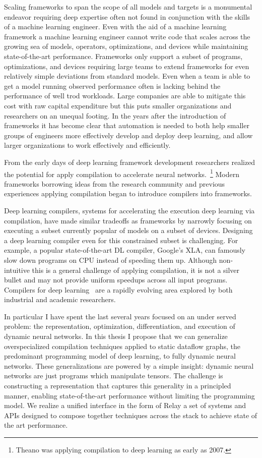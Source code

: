 Scaling frameworks to span the scope of all models and targets is a monumental endeavor
  requiring deep expertise often not found in conjunction with the skills of a
  machine learning engineer.
Even with the aid of a machine learning framework a machine learning engineer
  cannot write code that scales across the growing sea of
  models, operators, optimizations, and devices while maintaining state-of-the-art performance.
Frameworks only support a subset of programs, optimizations, and devices
  requiring large teams to extend frameworks for even relatively simple deviations
  from standard models.
Even when a team is able to get a model running observed performance often
  is lacking behind the performance of well trod workloads.
Large companies are able to mitigate this cost with raw capital expenditure
  but this puts smaller organizations and researchers on an unequal footing.
In the years after the introduction of frameworks it has become clear
  that automation is needed to both help smaller groups of engineers
  more effectively develop and deploy deep learning, and allow larger
  organizations to work effectively and efficiently.

From the early days of deep learning framework development researchers realized the
  potential for apply compilation to accelerate neural networks.~\footnote{Theano was applying
  compilation to deep learning as early as 2007.}
Modern frameworks borrowing ideas from the research community and previous
  experiences applying compilation began to introduce compilers into frameworks.

Deep learning compilers, systems for accelerating the execution deep learning via compilation,
 have made similar tradeoffs as frameworks by narrowly focusing on executing a subset
 currently popular of models on a subset of devices.
Designing a deep learning compiler even for this constrained subset is challenging.
For example,
  a popular state-of-the-art DL compiler,
  Google's XLA, can famously slow down programs on
  CPU instead of speeding them up.
Although non-intuitive this is a general challenge of applying compilation,
  it is not a silver bullet and may not provide uniform speedups across all input programs.
Compilers for deep learning~\citep{xla,jax,glow,tvm_osdi18,myia,fluxjl,lattner2020mlir} are
  a rapidly evolving area explored by both industrial and academic researchers.

In particular I have spent the last several years focused on an under served problem:
  the representation,
  optimization,
  differentiation,
  and execution of dynamic neural networks.
In this thesis I propose that we can generalize overspecialized
  compilation techniques applied to static dataflow graphs,
  the predominant programming model of deep learning,
  to fully dynamic neural networks.
These generalizations are powered by a simple insight:
  dynamic neural networks are just programs which manipulate tensors.
The challenge is constructing a representation that captures this generality
  in a principled manner, enabling state-of-the-art performance without limiting the programming model.
We realize a unified interface in the form of Relay a set of systems and APIs designed
  to compose together techniques across the stack to achieve state of the art performance.

